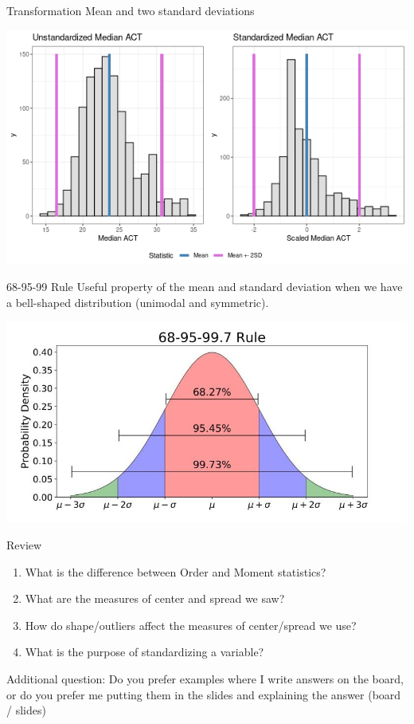 \documentclass{beamer}
\begin{document}
\begin{frame}{Transformation}
\footnotesize
Mean and two standard deviations
\begin{center}
\includegraphics[scale=0.5]{scaled_act3.png}
\end{center}
\end{frame}



\begin{frame}{68-95-99 Rule}
Useful property of the mean and standard deviation when we have a bell-shaped distribution (unimodal and symmetric).
\begin{center}
\includegraphics[scale=0.4]{empirical_rule.jpg}
\end{center}
\end{frame}


\begin{frame}{Review}

\begin{enumerate}
\item What is the difference between Order and Moment statistics?
\item What are the measures of center and spread we saw?
\item How do shape/outliers affect the measures of center/spread we use?
\item What is the purpose of standardizing a variable?
\end{enumerate} \vspace{10mm}

Additional question: Do you prefer examples where I write answers on the board, or do you prefer me putting them in the slides and explaining the answer (board / slides)
\end{frame}
\end{document}
